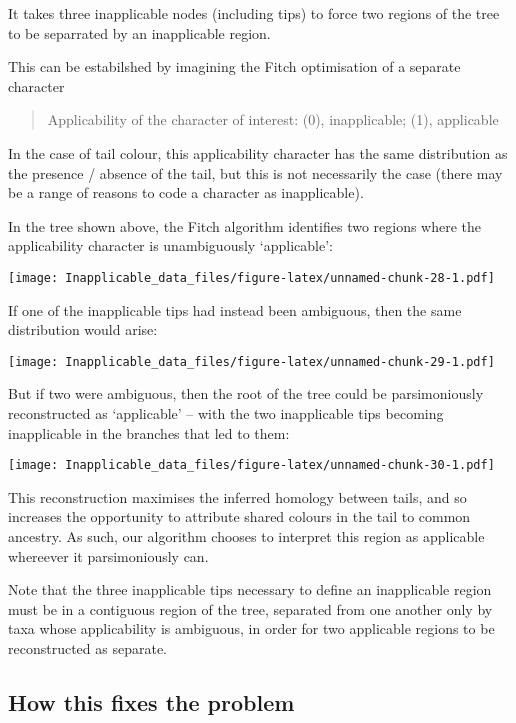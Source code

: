 \documentclass[]{book}
\theoremstyle{definition}
\theoremstyle{definition}
\theoremstyle{definition}
\theoremstyle{remark}
\begin{document}
It takes three inapplicable nodes (including tips) to force two regions
of the tree to be separrated by an inapplicable region.

This can be estabilshed by imagining the Fitch optimisation of a
separate character

\begin{quote}
Applicability of the character of interest: (0), inapplicable; (1),
applicable
\end{quote}

In the case of tail colour, this applicability character has the same
distribution as the presence / absence of the tail, but this is not
necessarily the case (there may be a range of reasons to code a
character as inapplicable).

In the tree shown above, the Fitch algorithm identifies two regions
where the applicability character is unambiguously `applicable':

\texttt{[image: Inapplicable\_data\_files/figure-latex/unnamed-chunk-28-1.pdf]}

If one of the inapplicable tips had instead been ambiguous, then the
same distribution would arise:

\texttt{[image: Inapplicable\_data\_files/figure-latex/unnamed-chunk-29-1.pdf]}

But if two were ambiguous, then the root of the tree could be
parsimoniously reconstructed as `applicable' -- with the two
inapplicable tips becoming inapplicable in the branches that led to
them:

\texttt{[image: Inapplicable\_data\_files/figure-latex/unnamed-chunk-30-1.pdf]}

This reconstruction maximises the inferred homology between tails, and
so increases the opportunity to attribute shared colours in the tail to
common ancestry. As such, our algorithm chooses to interpret this region
as applicable whereever it parsimoniously can.

Note that the three inapplicable tips necessary to define an
inapplicable region must be in a contiguous region of the tree,
separated from one another only by taxa whose applicability is
ambiguous, in order for two applicable regions to be reconstructed as
separate.

\hypertarget{how-this-fixes-the-problem}{%
\subsection{How this fixes the
problem}\label{how-this-fixes-the-problem}}
\end{document}
